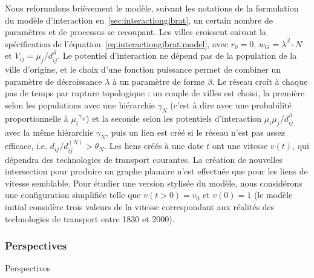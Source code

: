 Nous reformulons brièvement le modèle, suivant les notations de la formulation du modèle d'interaction en~\ref{sec:interactiongibrat}, un certain nombre de paramètres et de processus se recoupant. Les villes croissent suivant la spécification de l'équation~\ref{eq:interactiongibrat:model}, avec $r_0 = 0$, $w_G = \lambda^\beta \cdot N$ et $V_{ij} = \mu_j / d_{ij}^\beta$. Le potentiel d'interaction ne dépend pas de la population de la ville d'origine, et le choix d'une fonction puissance permet de combiner un paramètre de décroissance $\lambda$ à un paramètre de forme $\beta$. Le réseau croît à chaque pas de temps par rupture topologique : un couple de villes est choisi, la première selon les populations avec une hiérarchie $\gamma_N$ (c'est à dire avec une probabilité proportionnelle à ${\mu_i}^{\gamma_N}$) et la seconde selon les potentiels d'interaction $\mu_i \mu_j / d_{ij}^\beta$ avec la même hiérarchie $\gamma_N$, puis un lien est créé si le réseau n'est pas assez efficace, i.e. $d_{ij}/d^{(N)}_{ij}> \theta_N$. Les liens créés à une date $t$ ont une vitesse $v(t)$, qui dépendra des technologies de transport courantes. La création de nouvelles intersection pour produire un graphe planaire n'est effectuée que pour les liens de vitesse semblable. Pour étudier une version stylisée du modèle, nous considérons une configuration simplifiée telle que $v(t > 0) = v_0$ et $v(0) = 1$ (le modèle initial considère trois valeurs de la vitesse correspondant aux réalités des technologies de transport entre 1830 et 2000).



\subsubsection{Perspectives}{Perspectives}

